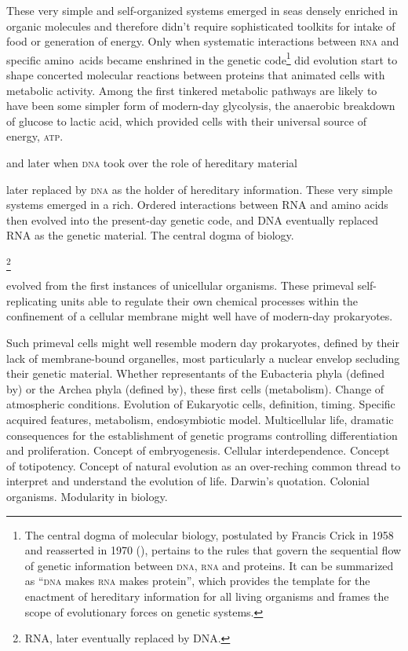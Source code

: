 \documentclass{tufte-book}
\begin{document}
These very simple and \mbox{self-organized} systems emerged in seas
densely enriched in organic molecules and therefore didn't require
sophisticated toolkits for intake of food or generation of energy.
Only when systematic interactions between \textsc{rna} and specific
amino~acids became enshrined in the genetic code\footnote{The central
  dogma of molecular biology, postulated by Francis Crick in 1958 and
  reasserted in 1970
  (\citealp{crick_protein_1958,crick_central_1970}), pertains to the
  rules that govern the sequential flow of genetic information between
  \textsc{dna}, \textsc{rna} and proteins. It can be summarized as
  ``\textsc{dna} makes \textsc{rna} makes protein'', which provides
  the template for the enactment of hereditary information for all
  living organisms and frames the scope of evolutionary forces on
  genetic systems.} did evolution start to shape concerted molecular
reactions between proteins that animated cells with metabolic
activity.  Among the first tinkered metabolic pathways are likely to
have been some simpler form of \mbox{modern-day} glycolysis, the
anaerobic breakdown of glucose to lactic acid, which provided cells
with their universal source of energy, \textsc{atp}.

and later when
\textsc{dna} took over the role of hereditary material

later replaced by \textsc{dna} as the holder of
hereditary information.  These very simple systems emerged in a rich.  Ordered
interactions between RNA and amino acids then evolved into the present-day
genetic code, and DNA eventually replaced RNA as the genetic material. The
central dogma of biology.

\footnote{RNA, later
  eventually replaced by DNA.}

evolved from the
first instances of unicellular organisms. These primeval \mbox{self-replicating}
units able to regulate their own chemical processes within the confinement of a
cellular membrane might well have of \mbox{modern-day} prokaryotes.

Such primeval cells might well resemble modern day
prokaryotes, defined by their lack of membrane-bound organelles, most
particularly a nuclear envelop secluding their genetic material.  Whether
representants of the Eubacteria phyla (defined by) or the Archea phyla (defined
by), these first cells (metabolism).  Change of atmospheric conditions.
Evolution of Eukaryotic cells, definition, timing.  Specific acquired features,
metabolism, endosymbiotic model.  Multicellular life, dramatic consequences for
the establishment of genetic programs controlling differentiation and
proliferation.  Concept of embryogenesis.  Cellular interdependence. Concept of
totipotency.  Concept of natural evolution as an over-reching common thread to
interpret and understand the evolution of life.  Darwin's quotation.  Colonial
organisms.  Modularity in biology.
\end{document}
